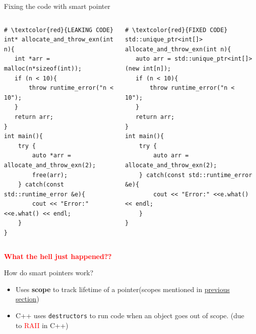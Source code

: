 \documentclass[
  10pt,
  ignorenonframetext,
]{beamer}
\providecommand{\tightlist}{%
  \setlength{\itemsep}{0pt}\setlength{\parskip}{0pt}}
\begin{document}
\begin{frame}[fragile]{Fixing the code with smart
pointer}
\protect\hypertarget{fixing-the-code-with-smart-pointer}{}
\begin{columns}[T]
\begin{column}{0.48\textwidth}
\scriptsize

\begin{verbatim}
# \textcolor{red}{LEAKING CODE}
int* allocate_and_throw_exn(int n){
   int *arr = malloc(n*sizeof(int));
   if (n < 10){
       throw runtime_error("n < 10");
   }
   return arr;
}
int main(){
    try {
        auto *arr = allocate_and_throw_exn(2);
        free(arr);
    } catch(const std::runtime_error &e){
        cout << "Error:" <<e.what() << endl;
    }
}
\end{verbatim}

\normalsize

\pause
\end{column}

\begin{column}{0.48\textwidth}
\scriptsize

\begin{verbatim}
# \textcolor{red}{FIXED CODE}
std::unique_ptr<int[]> allocate_and_throw_exn(int n){
   auto arr = std::unique_ptr<int[]>(new int[n]);
   if (n < 10){
       throw runtime_error("n < 10");
   }
   return arr;
}
int main(){
    try {
        auto arr = allocate_and_throw_exn(2);
    } catch(const std::runtime_error &e){
        cout << "Error:" <<e.what() << endl;
    }
}
\end{verbatim}

\normalsize
\end{column}
\end{columns}

\pause
\begin{center}

\textbf{\textcolor{red}{What the hell just happened??}}
\end{center}
\end{frame}

\begin{frame}{How do smart pointers work?}
\protect\hypertarget{how-do-smart-pointers-work}{}
\pause

\begin{itemize}
\tightlist
\item
  Uses \textbf{scope} to track lifetime of a
  pointer(scopes mentioned in
  \protect\hyperlink{what-is-this-scope-thing}{previous
  section})
\end{itemize}

\pause

\begin{itemize}
\tightlist
\item
  C++ uses \texttt{destructors} to run code when
  an object goes out of scope. (due to
  \textcolor{red}{RAII} in C++)
\end{itemize}
\end{frame}
\end{document}
